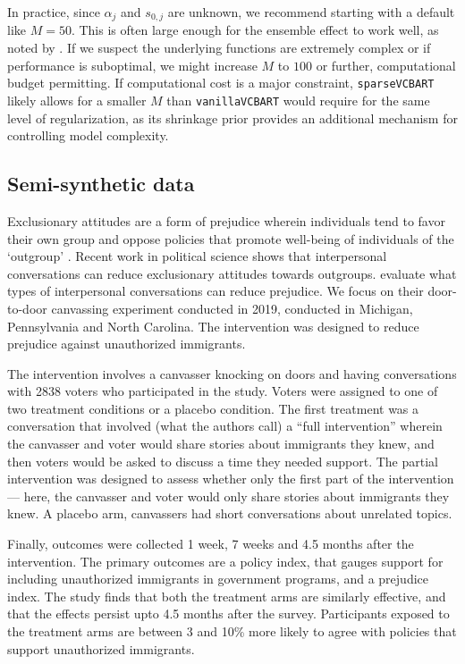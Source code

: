 \documentclass[11pt]{article}
\theoremstyle{plain}
\theoremstyle{definition}
\theoremstyle{plain}
\begin{document}
In practice, since $\alpha_j$ and $s_{0,j}$ are unknown, we recommend starting with a default like $M=50$. This is often large enough for the ensemble effect to work well, as noted by \citet{Deshpande2024}. If we suspect the underlying functions are extremely complex or if performance is suboptimal, we might increase $M$ to $100$ or further, computational budget permitting. If computational cost is a major constraint, \texttt{sparseVCBART} likely allows for a smaller $M$ than \texttt{vanillaVCBART} would require for the same level of regularization, as its shrinkage prior provides an additional mechanism for controlling model complexity.

\subsection{Semi-synthetic data}
\label{sec:datadesc}
Exclusionary attitudes are a form of prejudice wherein individuals tend to favor their own group and oppose policies that promote well-being of individuals of the `outgroup' \citep{kalla_broockman23}. Recent work in political science \citep{broockman_kalla16, williamson_etal21} shows that interpersonal conversations can reduce exclusionary attitudes towards outgroups. \citet{kalla_broockman23} evaluate what types of interpersonal conversations can reduce prejudice. We focus on their door-to-door canvassing experiment conducted in 2019, conducted in Michigan, Pennsylvania and North Carolina. The intervention was designed to reduce prejudice against unauthorized immigrants.  

The intervention involves a canvasser knocking on doors and having conversations with 2838 voters who participated in the study. Voters were assigned to one of two treatment conditions or a placebo condition. The first treatment was a conversation that involved (what the authors call) a “full intervention” wherein the canvasser and voter would share stories about immigrants they knew, and then voters would be asked to discuss a time they needed support. The partial intervention was designed to assess whether only the first part of the intervention— here, the canvasser and voter would only share stories about immigrants they knew. A placebo arm, canvassers had short conversations about unrelated topics. 

Finally, outcomes were collected 1 week, 7 weeks and 4.5 months after the intervention. The primary outcomes are a policy index, that gauges support for including unauthorized immigrants in government programs, and a prejudice index. The study finds that both the treatment arms are similarly effective, and that the effects persist upto 4.5 months after the survey. Participants exposed to the treatment arms are between 3 and 10\% more likely to agree with policies that support unauthorized immigrants. 
\end{document}
